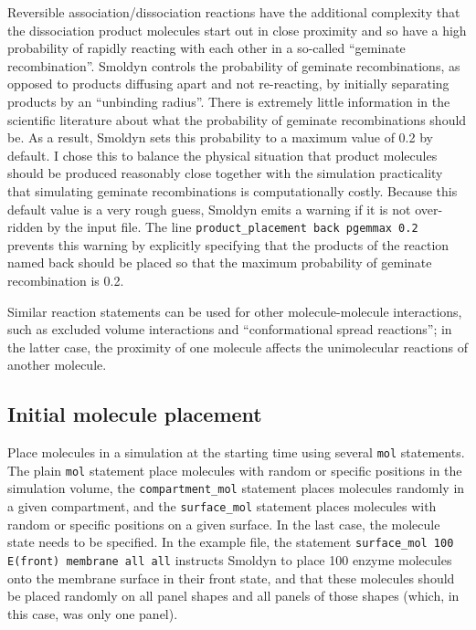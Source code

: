 \documentclass {scrbook}
\newcommand {\ttt} {\texttt}
\begin{document}
Reversible association/dissociation reactions have the additional complexity that the dissociation product molecules start out in close proximity and so have a high probability of rapidly reacting with each other in a so-called ``geminate recombination''. Smoldyn controls the probability of geminate recombinations, as opposed to products diffusing apart and not re-reacting, by initially separating products by an ``unbinding radius''. There is extremely little information in the scientific literature about what the probability of geminate recombinations should be. As a result, Smoldyn sets this probability to a maximum value of 0.2 by default. I chose this to balance the physical situation that product molecules should be produced reasonably close together with the simulation practicality that simulating geminate recombinations is computationally costly. Because this default value is a very rough guess, Smoldyn emits a warning if it is not over-ridden by the input file. The line  \ttt{product\_placement back pgemmax 0.2} prevents this warning by explicitly specifying that the products of the reaction named back should be placed so that the maximum probability of geminate recombination is 0.2.

Similar reaction statements can be used for other molecule-molecule interactions, such as excluded volume interactions and ``conformational spread reactions''; in the latter case, the proximity of one molecule affects the unimolecular reactions of another molecule.

\subsection*{Initial molecule placement}

Place molecules in a simulation at the starting time using several  \ttt{mol} statements. The plain  \ttt{mol} statement place molecules with random or specific positions in the simulation volume, the  \ttt{compartment\_mol} statement places molecules randomly in a given compartment, and the  \ttt{surface\_mol} statement places molecules with random or specific positions on a given surface. In the last case, the molecule state needs to be specified. In the example file, the statement  \ttt{surface\_mol 100 E(front) membrane all all} instructs Smoldyn to place 100 enzyme molecules onto the membrane surface in their front state, and that these molecules should be placed randomly on all panel shapes and all panels of those shapes (which, in this case, was only one panel).
\end{document}

